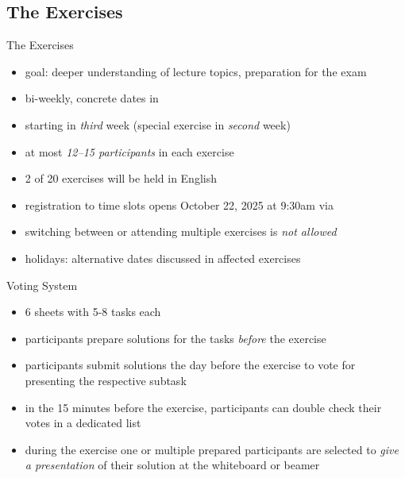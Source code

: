 \subsection{The Exercises}
\begin{frame}{\insertsubsection}
	\begin{fancycolumns}[widths={45}]
		\begin{definition}{The Exercises}
			\begin{itemize}
				\item goal: deeper understanding of lecture topics, preparation for the exam
				\item bi-weekly, concrete dates in \StudIPExercise
				\item starting in \emph{third} week (special exercise in \emph{second} week)
				\item at most \emph{12--15 participants} in each exercise
				\item 2 of 20 exercises will be held in English
				\item registration to time slots opens October 22, 2025 at 9:30am via \StudIPExercise
				\item switching between or attending multiple exercises is \emph{not allowed}
				\item holidays: alternative dates discussed in affected exercises
			\end{itemize}
		\end{definition}
		\nextcolumn
		\begin{definition}{Voting System }
			\begin{itemize}
				\item 6 sheets with 5-8 tasks each
				\item participants prepare solutions for the tasks \emph{before} the exercise
				\item participants submit solutions the day before the exercise to vote  for presenting the respective subtask
				\item in the 15 minutes before the exercise, participants can double check their votes  in a dedicated list 
				\item during the exercise one or multiple prepared participants are selected to \emph{give a presentation} of their solution at the whiteboard or beamer

\end{itemize}
\end{definition}
\end{fancycolumns}
\end{frame}
